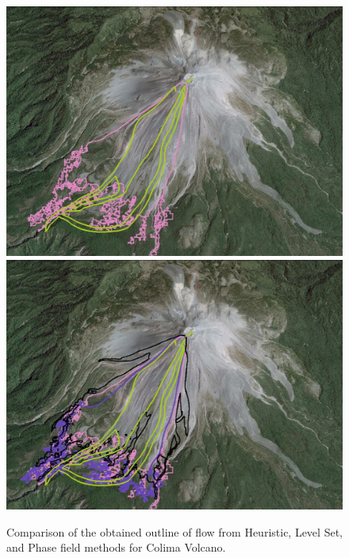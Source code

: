 \documentclass[review]{elsarticle}
\begin{document}
\begin{figure}[H]
\begin{minipage}[b]{.5 \textwidth}
                \includegraphics[width=1\textwidth]{IMAGES/phasefield1.jpg}
                \includegraphics[width=1\textwidth]{IMAGES/comparison1.jpg}
        \end{minipage}
        \caption{Comparison of the obtained outline of flow from Heuristic, Level Set, and Phase field methods for Colima Volcano.}
        \label{Colimapic}
\end{figure}
\end{document}
